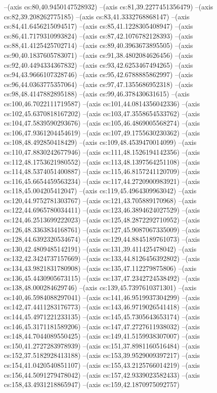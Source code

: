--(axis cs:80,40.9450147528932)
--(axis cs:81,39.2277451356479)
--(axis cs:82,39.208262775185)
--(axis cs:83,41.3332768868147)
--(axis cs:84,41.6456215094517)
--(axis cs:85,41.1228305408947)
--(axis cs:86,41.7179310993824)
--(axis cs:87,42.1076782128393)
--(axis cs:88,41.4125425702714)
--(axis cs:89,40.3963673895505)
--(axis cs:90,40.1837605783071)
--(axis cs:91,38.4802084626456)
--(axis cs:92,40.4494334367832)
--(axis cs:93,42.6253467494265)
--(axis cs:94,43.9666107328746)
--(axis cs:95,42.6788885862997)
--(axis cs:96,44.0363775357064)
--(axis cs:97,47.1355686952318)
--(axis cs:98,48.4147882895188)
--(axis cs:99,46.378430631615)
--(axis cs:100,46.7022111719587)
--(axis cs:101,44.0814356042336)
--(axis cs:102,45.6370818167202)
--(axis cs:103,47.3558654533762)
--(axis cs:104,47.5839590293676)
--(axis cs:105,46.4869005568274)
--(axis cs:106,47.9361204454619)
--(axis cs:107,49.1755630230362)
--(axis cs:108,48.492850418429)
--(axis cs:109,48.4539470014099)
--(axis cs:110,47.8830242677946)
--(axis cs:111,48.1526194142356)
--(axis cs:112,48.1753621980552)
--(axis cs:113,48.1397564251108)
--(axis cs:114,48.5374051400887)
--(axis cs:115,46.8157241120709)
--(axis cs:116,45.6654459563234)
--(axis cs:117,44.2720900983921)
--(axis cs:118,45.004205412047)
--(axis cs:119,45.4964309963042)
--(axis cs:120,44.9752781303767)
--(axis cs:121,43.705889170968)
--(axis cs:122,44.6965780034411)
--(axis cs:123,46.3894624027529)
--(axis cs:124,46.2513699222023)
--(axis cs:125,48.2872292710952)
--(axis cs:126,48.3363834168761)
--(axis cs:127,45.9087067335009)
--(axis cs:128,44.6392320534674)
--(axis cs:129,44.8845189761073)
--(axis cs:130,42.4809485142191)
--(axis cs:131,39.411425478042)
--(axis cs:132,42.3424737157669)
--(axis cs:133,44.8126456392802)
--(axis cs:134,43.9821831780908)
--(axis cs:135,47.112279875806)
--(axis cs:136,45.4430905673115)
--(axis cs:137,47.2342724538492)
--(axis cs:138,48.000284629746)
--(axis cs:139,45.7397610371301)
--(axis cs:140,46.5984088297041)
--(axis cs:141,46.9519937304299)
--(axis cs:142,47.4411283176773)
--(axis cs:143,46.9719026541418)
--(axis cs:144,45.4971221233135)
--(axis cs:145,45.7305643653174)
--(axis cs:146,45.3171181589206)
--(axis cs:147,47.2727611938032)
--(axis cs:148,44.7044089550425)
--(axis cs:149,41.5159938307007)
--(axis cs:150,41.2727283978939)
--(axis cs:151,37.8981160516484)
--(axis cs:152,37.5182928413188)
--(axis cs:153,39.9529009397217)
--(axis cs:154,41.0420540851107)
--(axis cs:155,43.2125766014219)
--(axis cs:156,44.5091279478042)
--(axis cs:157,42.9339023582433)
--(axis cs:158,43.4931218865947)
--(axis cs:159,42.1870975092757)
